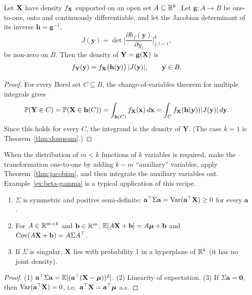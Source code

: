 \documentclass[main.tex]{subfiles}
\begin{document}
\begin{theorem}\label{thm:jacobian}
Let $\mathbf{X}$ have density $f_{\mathbf{X}}$ supported on an open set $A\subseteq\mathbb{R}^k$. Let $\mathbf g:A\to B$ be one-to-one, onto and continuously differentiable, and let the Jacobian determinant of its inverse $\mathbf h=\mathbf g^{-1}$,
\[
J(\mathbf y)=\det\Big[\frac{\partial h_j(\mathbf y)}{\partial y_l}\Big]_{j,l=1}^k ,
\]
be non-zero on $B$. Then the density of $\mathbf Y=\mathbf g(\mathbf{X})$ is
\[
f_{\mathbf Y}(\mathbf y)=f_{\mathbf{X}}\big(\mathbf h(\mathbf y)\big)\,|J(\mathbf y)|,\qquad\mathbf y\in B .
\]
\end{theorem}
\begin{proof}
For every Borel set $C\subseteq B$, the change-of-variables theorem for multiple integrals gives
\[
\mathbb{P}(\mathbf Y\in C)=\mathbb{P}(\mathbf{X}\in\mathbf h(C))=\int_{\mathbf h(C)}f_{\mathbf{X}}(\mathbf{x})\,d\mathbf{x}=\int_Cf_{\mathbf{X}}(\mathbf h(\mathbf y))|J(\mathbf y)|\,d\mathbf y .
\]
Since this holds for every $C$, the integrand is the density of $\mathbf Y$. (The case $k=1$ is Theorem~\ref{thm:donusum}.)
\end{proof}

\begin{remark}
When the distribution of $m<k$ functions of $k$ variables is required, make the transformation one-to-one by adding $k-m$ ``auxiliary'' variables, apply Theorem~\ref{thm:jacobian}, and then integrate the auxiliary variables out. Example~\ref{ex:beta-gamma} is a typical application of this recipe.
\end{remark}

\begin{proposition}\label{prop:kovaryans}
\begin{enumerate}
  \item $\Sigma$ is symmetric and positive semi-definite: $\mathbf a^\top\Sigma\mathbf a=\operatorname{Var}(\mathbf a^\top\mathbf{X})\ge0$ for every $\mathbf a$.
  \item For $A\in\mathbb{R}^{m\times k}$ and $\mathbf b\in\mathbb{R}^m$, $\mathbb{E}[A\mathbf{X}+\mathbf b]=A\bm\mu+\mathbf b$ and $\operatorname{Cov}(A\mathbf{X}+\mathbf b)=A\Sigma A^\top$.
  \item If $\Sigma$ is singular, $\mathbf{X}$ lies with probability 1 in a hyperplane of $\mathbb{R}^k$ (it has no joint density).
\end{enumerate}
\end{proposition}
\begin{proof}
(1) $\mathbf a^\top\Sigma\mathbf a=\mathbb{E}[(\mathbf a^\top(\mathbf{X}-\bm\mu))^2]$. (2) Linearity of expectation. (3) If $\Sigma\mathbf a=\mathbf 0$, then $\operatorname{Var}(\mathbf a^\top\mathbf{X})=0$, i.e.\ $\mathbf a^\top\mathbf{X}=\mathbf a^\top\bm\mu$ a.s.
\end{proof}
\end{document}
